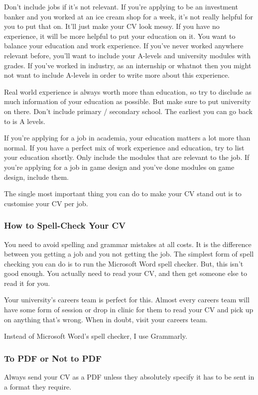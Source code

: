 \documentclass{article}
\begin{document}
Don't include jobs if it's not relevant. If you're applying to be an
investment banker and you worked at an ice cream shop for a week, it's
not really helpful for you to put that on. It'll just make your CV look
messy. If you have no experience, it will be more helpful to put your
education on it. You want to balance your education and work experience.
If you've never worked anywhere relevant before, you'll want to include
your A-levels and university modules with grades. If you've worked in
industry, as an internship or whatnot then you might not want to include
A-levels in order to write more about this experience.

Real world experience is always worth more than education, so try to
disclude as much information of your education as possible. But make
sure to put university on there. Don't include primary / secondary
school. The earliest you can go back to is A levels.

If you're applying for a job in academia, your education matters a lot
more than normal. If you have a perfect mix of work experience and
education, try to list your education shortly. Only include the modules
that are relevant to the job. If you're applying for a job in game
design and you've done modules on game design, include them.

The single most important thing you can do to make your CV stand out is
to customise your CV per job.

\subsubsection{How to Spell-Check Your CV}
You need to avoid spelling and grammar mistakes at all costs. It is the
difference between you getting a job and you not getting the job. The
simplest form of spell checking you can do is to run the Microsoft Word
spell checker. But, this isn't good enough. You actually need to read
your CV, and then get someone else to read it for you.

Your university's careers team is perfect for this. Almost every careers
team will have some form of session or drop in clinic for them to read
your CV and pick up on anything that's wrong. When in doubt, visit your
careers team.

Instead of Microsoft Word's spell checker, I use Grammarly.

\subsubsection{To PDF or Not to PDF}
Always send your CV as a PDF unless they absolutely specify it has to be
sent in a format they require.
\end{document}
